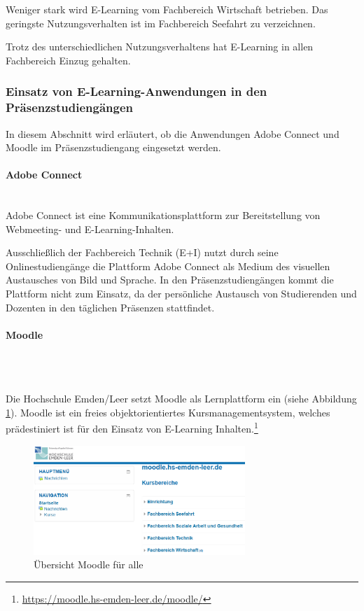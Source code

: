 Weniger stark wird E-Learning vom Fachbereich Wirtschaft betrieben. Das geringste Nutzungsverhalten ist im Fachbereich Seefahrt zu verzeichnen.

Trotz des unterschiedlichen Nutzungsverhaltens hat E-Learning in allen Fachbereich Einzug gehalten.

\subsubsection[Einsatz von E-Learning-Anwendungen]{Einsatz von E-Learning-Anwendungen in den Präsenzstudiengängen}
In diesem Abschnitt wird erläutert, ob die Anwendungen Adobe Connect und Moodle im Präsenzstudiengang eingesetzt werden.

\paragraph{Adobe Connect}\mbox{} \\

Adobe Connect ist eine Kommunikationsplattform zur Bereitstellung von Webmeeting- und E-Learning-Inhalten.

Ausschließlich der Fachbereich Technik (E+I) nutzt durch seine Onlinestudiengänge die Plattform Adobe Connect als Medium des visuellen Austausches von Bild und Sprache. In den Präsenzstudiengängen kommt die Plattform nicht zum Einsatz, da der persönliche Austausch von Studierenden und Dozenten in den täglichen Präsenzen stattfindet.

\paragraph{Moodle}\mbox{}\\\\
\label{paragraph_moodle}

Die Hochschule Emden/Leer setzt Moodle als Lernplattform ein (siehe Abbildung \ref{fig_moodle}). Moodle ist ein freies objektorientiertes Kursmanagementsystem, welches prädestiniert ist für den Einsatz von E-Learning Inhalten.\footnote{\url{https://moodle.hs-emden-leer.de/moodle/}}

\begin{figure}[h!]
	\centering
	\includegraphics[width=8cm]{kapitel/gruppe2/bilder/moodle}
	\caption{Übersicht Moodle für alle}
	\label{fig_moodle}
\end{figure}

